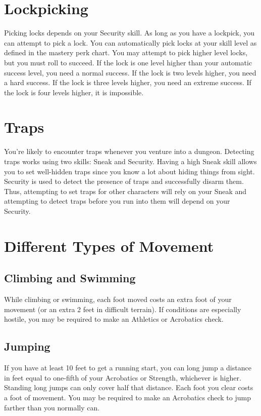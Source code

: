 \documentclass[12pt]{book}
\begin{document}
\section{Lockpicking}
Picking locks depends on your Security skill. As long as you have a lockpick, you can attempt to pick a lock. You can automatically pick locks at your skill level as defined in the mastery perk chart. You may attempt to pick higher level locks, but you must roll to succeed. If the lock is one level higher than your automatic success level, you need a normal success. If the lock is two levels higher, you need a hard success. If the lock is three levels higher, you need an extreme success. If the lock is four levels higher, it is impossible.

\section{Traps}
You're likely to encounter traps whenever you venture into a dungeon. Detecting traps works using two skills: Sneak and Security. Having a high Sneak skill allows you to set well-hidden traps since you know a lot about hiding things from sight. Security is used to detect the presence of traps and successfully disarm them. Thus, attempting to set traps for other characters will rely on your Sneak and attempting to detect traps before you run into them will depend on your Security.

\section{Different Types of Movement}

\subsection{Climbing and Swimming}
While climbing or swimming, each foot moved costs an extra foot of your movement (or an extra 2 feet in difficult terrain). If conditions are especially hostile, you may be required to make an Athletics or Acrobatics check.

\subsection{Jumping}
If you have at least 10 feet to get a running start, you can long jump a distance in feet equal to one-fifth of your Acrobatics or Strength, whichever is higher. Standing long jumps can only cover half that distance. Each foot you clear costs a foot of movement. You may be required to make an Acrobatics check to jump farther than you normally can.
\end{document}
